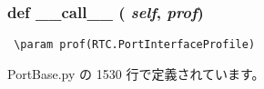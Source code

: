 \subsubsection{\setlength{\rightskip}{0pt plus 5cm}def \_\-\_\-call\_\-\_\- ( {\em self},  {\em prof})}\label{classsource__py_1_1_port_base_1_1_port_base_1_1find__interface_e844e0019d38360a86bac1474132db3c}




\footnotesize\begin{verbatim}
 \param prof(RTC.PortInterfaceProfile)
\end{verbatim}
\normalsize
 

 PortBase.py の 1530 行で定義されています。